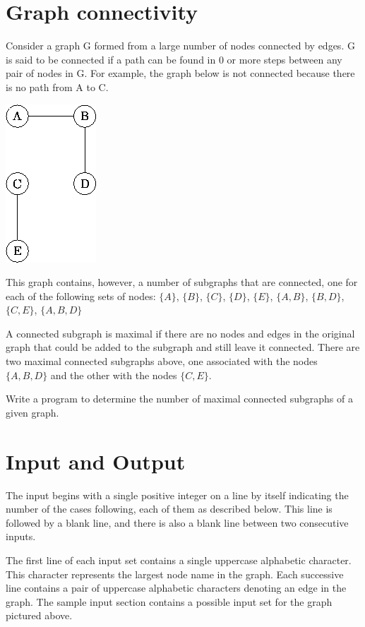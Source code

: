 \documentclass{article}
\begin{document}
\section*{\fontsize{12}{25}Graph connectivity}

Consider a graph G formed from a large number of nodes connected by edges. G is said to be connected if a path can be found in 0 or more steps between any pair of nodes in G. For example, the graph below is not connected because there is no path from A to C.

\includegraphics{problem-image1.png}

This graph contains, however, a number of subgraphs that are connected, one for each of the following sets of nodes: $\{A\}$, $\{B\}$, $\{C\}$, $\{D\}$, $\{E\}$, $\{A,B\}$, $\{B,D\}$, $\{C,E\}$, $\{A,B,D\}$

A connected subgraph is maximal if there are no nodes and edges in the original graph that could be added to the subgraph and still leave it connected. There are two maximal connected subgraphs above, one associated with the nodes $\{A, B, D\}$ and the other with the nodes $\{C, E\}$.

Write a program to determine the number of maximal connected subgraphs of a given graph.

\section*{Input and Output}
The input begins with a single positive integer on a line by itself indicating the number of the cases following, each of them as described below. This line is followed by a blank line, and there is also a blank line between two consecutive inputs.

The first line of each input set contains a single uppercase alphabetic character. This character represents the largest node name in the graph. Each successive line contains a pair of uppercase alphabetic characters denoting an edge in the graph. The sample input section contains a possible input set for the graph pictured above.
\end{document}
